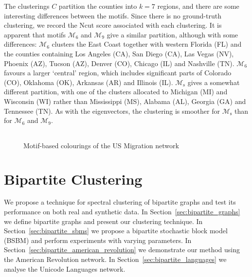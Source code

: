 \documentclass[12pt,draft]{ociamthesis}
\theoremstyle{plain}
\theoremstyle{definition}
\theoremstyle{remark}
\newcommand\ca[1]{\mathcal{#1}}
\begin{document}
The clusterings $C$ partition the counties into $k=7$ regions, and there are
some interesting differences between the motifs.
Since there is no ground-truth clustering, we record the Ncut score associated
with each clustering.
It is apparent that motifs $\ca{M}_6$ and $\ca{M}_9$ give a similar partition,
although with some differences:
$\ca{M}_6$ clusters the East Coast together with western Florida (FL) and the
counties containing Los Angeles (CA), San Diego (CA), Las Vegas (NV), Phoenix
(AZ), Tucson (AZ), Denver (CO), Chicago (IL) and Nashville (TN).
$\ca{M}_6$ favours a larger `central' region, which includes significant parts
of Colorado (CO), Oklahoma (OK), Arkansas (AR) and Illinois (IL).
$\ca{M}_\mathrm{s}$ gives a somewhat different partition, with one of the
clusters allocated to Michigan (MI) and Wisconsin (WI) rather than Mississippi
(MS), Alabama (AL), Georgia (GA) and Tennessee (TN). As with the eigenvectors,
the clustering is smoother for $\ca{M}_\mathrm{s}$ than for $\ca{M}_6$ and
$\ca{M}_9$.

\pagebreak

\vspace*{-1cm}
\begin{figure}[H]
\begin{table}[H]
\centering
\setlength{\tabcolsep}{0em}
\begin{tabular}{ |c|c|c|c| }
\end{tabular}
\end{table}
\vspace*{-0.5cm}
\caption{Motif-based colourings of the US Migration network}
\label{fig:us_migration}
\end{figure}
\clearpage{}
\clearpage{}
\chapter{Bipartite Clustering} \label{chap:bipartite}

We propose a technique for spectral clustering of bipartite graphs and test its
performance on both real and synthetic data.
In Section~\ref{sec:bipartite_graphs} we define bipartite graphs and present
our clustering technique.
In Section~\ref{sec:bipartite_sbms} we propose a bipartite stochastic block
model (BSBM) and perform experiments with varying parameters.
In Section~\ref{sec:bipartite_american_revolution} we demonstrate our method
using the American Revolution network.
In Section~\ref{sec:bipartite_languages} we analyse the Unicode Languages
network.
\end{document}
